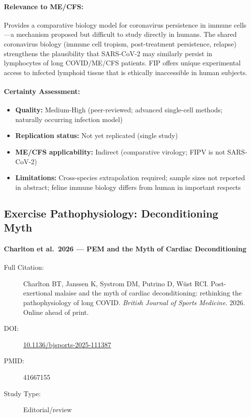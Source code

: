 \paragraph{Relevance to ME/CFS:}
Provides a comparative biology model for coronavirus persistence in immune cells---a mechanism proposed but difficult to study directly in humans. The shared coronavirus biology (immune cell tropism, post-treatment persistence, relapse) strengthens the plausibility that SARS-CoV-2 may similarly persist in lymphocytes of long COVID/ME/CFS patients. FIP offers unique experimental access to infected lymphoid tissue that is ethically inaccessible in human subjects.

\paragraph{Certainty Assessment:}
\begin{itemize}
    \item \textbf{Quality:} Medium-High (peer-reviewed; advanced single-cell methods; naturally occurring infection model)
    \item \textbf{Replication status:} Not yet replicated (single study)
    \item \textbf{ME/CFS applicability:} Indirect (comparative virology; FIPV is not SARS-CoV-2)
    \item \textbf{Limitations:} Cross-species extrapolation required; sample sizes not reported in abstract; feline immune biology differs from human in important respects
\end{itemize}

\subsection{Exercise Pathophysiology: Deconditioning Myth}

\paragraph{Charlton et al.\ 2026 --- PEM and the Myth of Cardiac Deconditioning}

\begin{description}
    \item[Full Citation:] Charlton BT, Janssen K, Systrom DM, Putrino D, W\"ust RCI. Post-exertional malaise and the myth of cardiac deconditioning: rethinking the pathophysiology of long COVID. \textit{British Journal of Sports Medicine}. 2026. Online ahead of print.
    \item[DOI:] \href{https://doi.org/10.1136/bjsports-2025-111387}{10.1136/bjsports-2025-111387}
    \item[PMID:] 41667155
    \item[Study Type:] Editorial/review
\end{description}

